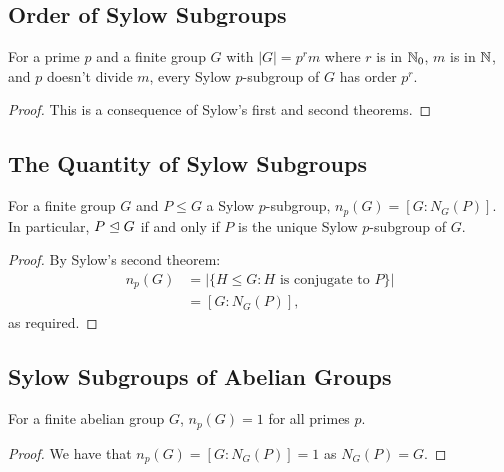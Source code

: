 \subsection{Order of Sylow Subgroups}

For a prime $p$ and a finite group $G$ with $|G| = p^rm$
where $r$ is in $\mathbb{N}_0$, $m$ is in $\mathbb{N}$, and 
$p$ doesn't divide $m$, every Sylow $p$-subgroup of $G$
has order $p^r$. 
\begin{proof}
    This is a consequence of Sylow's first and second theorems.
\end{proof}

\subsection{The Quantity of Sylow Subgroups}

For a finite group $G$ and $P \leq G$ a Sylow $p$-subgroup,
$n_p(G) = [G : N_G(P)]$. In particular, $P \trianglelefteq G$ if and
only if $P$ is the unique Sylow $p$-subgroup of $G$.

\begin{proof}
    By Sylow's second theorem: \begin{align*}
        n_p(G) &= |\{H \leq G : H \text{ is conjugate to } P\}| \\
        &= [G : N_G(P)],
    \end{align*} as required.
\end{proof}

\subsection{Sylow Subgroups of Abelian Groups}

For a finite abelian group $G$, $n_p(G) = 1$ for all primes $p$.

\begin{proof}
    We have that $n_p(G) = [G : N_G(P)] = 1$ as $N_G(P) = G$.
\end{proof}
